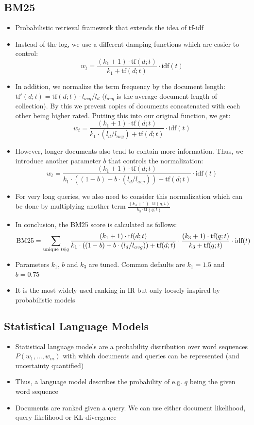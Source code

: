 \subsection{BM25}
\begin{itemize}
	\item Probabilistic retrieval framework that extends the idea of tf-idf
	\item Instead of the log, we use a different damping functions which are easier to control:
	$$w_t = \frac{(k_1 + 1)\cdot \text{tf}(d;t)}{k_1 + \text{tf}(d;t)}\cdot \text{idf}(t)$$
	\item In addition, we normalize the term frequency by the document length: $\text{tf}'(d;t) = \text{tf}(d;t) \cdot l_{avg}/l_{d}$ ($l_{avg}$ is the average document length of collection). By this we prevent copies of documents concatenated with each other being higher rated. Putting this into our original function, we get:
	$$w_t = \frac{(k_1 + 1) \cdot \text{tf}(d;t)}{k_1 \cdot (l_d / l_{avg})+ \text{tf}(d;t)}\cdot \text{idf}(t)$$
	\item However, longer documents also tend to contain more information. Thus, we introduce another parameter $b$ that controls the normalization:
	$$w_t = \frac{(k_1 + 1) \cdot \text{tf}(d;t)}{k_1 \cdot ((1-b) + b\cdot (l_d / l_{avg}))+ \text{tf}(d;t)}\cdot \text{idf}(t)$$
	\item For very long queries, we also need to consider this normalization which can be done by multiplying another term $\frac{(k_3 + 1)\cdot \text{tf}(q;t)}{k_3 \cdot \text{tf}(q;t)}$
	\item In conclusion, the BM25 score is calculated as follows:
	$$\text{BM25} = \sum\limits_{\text{unique\hspace{1mm}} t\in q} \frac{(k_1 + 1) \cdot \text{tf}(d;t)}{k_1 \cdot ((1-b) + b\cdot (l_d / l_{avg}))+ \text{tf}(d;t)} \cdot \frac{(k_3 + 1)\cdot \text{tf}(q;t)}{k_3 + \text{tf}(q;t)} \cdot \text{idf}(t)$$
	\item Parameters $k_1$, $b$ and $k_3$ are tuned. Common defaults are $k_1 = 1.5$ and $b=0.75$
	\item It is the most widely used ranking in IR but only loosely inspired by probabilistic models
\end{itemize}
\subsection{Statistical Language Models}
\begin{itemize}
	\item Statistical language models are a probability distribution over word sequences $P(w_1, ..., w_m)$ with which documents and queries can be represented (and uncertainty quantified)
	\item Thus, a language model describes the probability of e.g. $q$ being the given word sequence
	\item Documents are ranked given a query. We can use either document likelihood, query likelihood or KL-divergence
\end{itemize}
